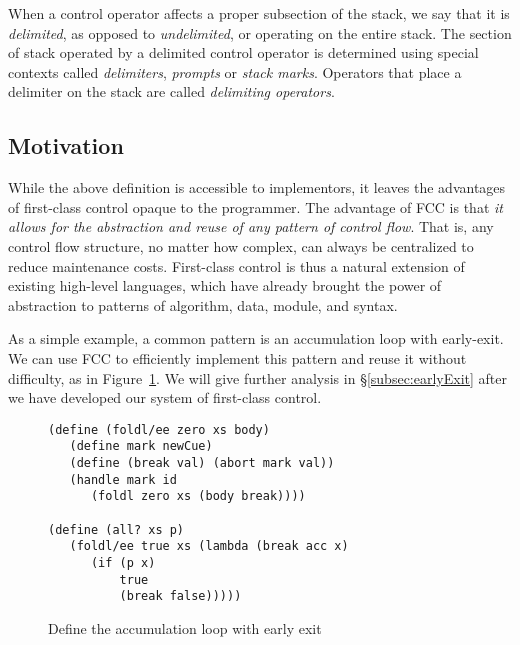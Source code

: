 \documentclass[11pt]{article}
\newcommand{\maybePage}{\newpage}
\begin{document}
When a control operator affects a proper subsection of the stack, we say that it is \emph{delimited}, as opposed to \emph{undelimited}, or operating on the entire stack.
The section of stack operated by a delimited control operator is determined using special contexts called \emph{delimiters}, \emph{prompts} or \emph{stack marks}.
Operators that place a delimiter on the stack are called \emph{delimiting operators}.


\maybePage
\subsection{Motivation}

While the above definition is accessible to implementors, it leaves the advantages of first-class control opaque to the programmer.
The advantage of FCC is that \emph{it allows for the abstraction and reuse of any pattern of control flow}.
That is, any control flow structure, no matter how complex, can always be centralized to reduce maintenance costs.
First-class control is thus a natural extension of existing high-level languages, which have already brought the power of abstraction to patterns of algorithm, data, module, and syntax.

As a simple example, a common pattern is an accumulation loop with early-exit.
We can use FCC to efficiently implement this pattern and reuse it without difficulty, as in Figure~\ref{fig:ex-foldl/ee}.
We will give further analysis in \S\ref{subsec:earlyExit} after we have developed our system of first-class control.

\begin{figure}[H]
\caption{Define the accumulation loop with early exit}
\label{fig:ex-foldl/ee}
\begin{verbatim}
(define (foldl/ee zero xs body)
   (define mark newCue)
   (define (break val) (abort mark val))
   (handle mark id
      (foldl zero xs (body break))))

(define (all? xs p)
   (foldl/ee true xs (lambda (break acc x)
      (if (p x)
          true
          (break false)))))
\end{verbatim}
\end{figure}
\end{document}
